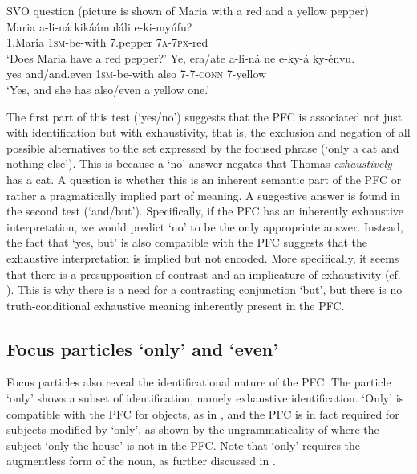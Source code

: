 \documentclass[output=paper]{langsci/langscibook}
\begin{document}
\ea\label{ex:vanderwal:19}
SVO question
       (picture is shown of Maria with a red and a yellow pepper)\\
\ea\label{ex:vanderwal:19a}
\gll      Maria    a-li-ná  kikáámuláli  e-ki-myúfu?\\
         1.Maria  \textsc{1sm}-be-with  7.pepper  \textsc{7a}-\textsc{7px}-red\\
\glt     ‘Does Maria have a red pepper?’
\ex\label{ex:vanderwal:19b}
\gll    Ye,  era/ate  a-li-ná  ne  e-ky-á    ky-énvu.\\
         yes  and/and.even  \textsc{1sm}-be-with  also  \textsc{7}-\textsc{7}-\textsc{conn}  7-yellow\\
\glt     ‘Yes, and she has also/even a yellow one.’
\z
\z

The first part of this test (‘yes/no’) suggests that the PFC is associated not just with identification but with exhaustivity, that is, the exclusion and negation of all possible alternatives to the set expressed by the focused phrase (‘only a cat and nothing else’). This is because a ‘no’ answer negates that Thomas \textit{exhaustively} has a cat. A question is whether this is an inherent semantic part of the PFC or rather a pragmatically implied part of meaning. A suggestive answer is found in the second test (‘and/but’). Specifically, if the PFC has an inherently exhaustive interpretation, we would predict ‘no’ to be the only appropriate answer. Instead, the fact that ‘yes, but’ is also compatible with the PFC suggests that the exhaustive interpretation is implied but not encoded. More specifically, it seems that there is a presupposition of contrast and an implicature of exhaustivity (cf. \citealt{ByramWashburn2013}). This is why there is a need for a contrasting conjunction ‘but’, but there is no truth-conditional exhaustive meaning inherently present in the PFC. 

\subsection{Focus particles ‘only’ and ‘even’}\label{sec:vanderwal:3.4}

Focus particles also reveal the identificational nature of the PFC. The particle ‘only’ shows a subset of identification, namely exhaustive identification. ‘Only’ is compatible with the PFC for objects, as in , and the PFC is in fact required for subjects modified by ‘only’, as shown by the ungrammaticality of  where the subject ‘only the house’ is not in the PFC. Note that ‘only’ requires the augmentless form of the noun, as further discussed in .
\end{document}
